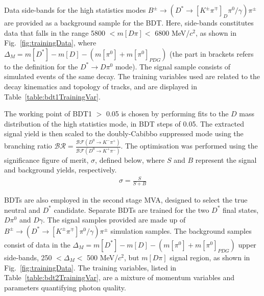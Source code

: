 \documentclass[oneside,12pt]{article}
\begin{document}
Data side-bands for the high statistics modes $B^{\pm}\rightarrow(D^{*}
\rightarrow [K^{\pm}\pi^{\mp}]_{D} \pi^0 /\gamma)\pi^{\pm}$ are provided as a
background sample for the BDT. Here, side-bands constitutes data that falls in
the range 5800 $ < m[D\pi] <$ 6800 MeV/$c^2$, as shown in
Fig.~\ref{fig:trainingData}, where $\Delta_M=m[D^{*}] - m[D]- (m[\pi^0] +
m[\pi^0]_{PDG})$ (the part in brackets refers to the definition for the
$D^*\rightarrow D\pi^0$ mode). The signal sample consists of simulated
events of the same decay. The training variables used are related to the
decay kinematics and topology of tracks, and are displayed in
Table~\ref{table:bdt1TrainingVar}. 

The working point of BDT1 $>$ 0.05 is chosen by performing fits to the $D$ mass
distribution of the high statistics mode, in BDT steps of 0.05. The extracted
signal yield is then scaled to the doubly-Cabibbo suppressed mode using the branching ratio
$\mathcal{BR} = \frac{\mathcal{BF}(D^0 \rightarrow K^- \pi^+)}{\mathcal{BF}(D^0
\rightarrow K^+ \pi^-)}$. The optimisation was performed using the significance
figure of merit, $\sigma$, defined below, where $S$ and $B$ represent the signal
and background yields, respectively.
\begin{align}
  \sigma = \frac{S}{S + B}
  \label{D_branching_ratio}
\end{align}

BDTs are also employed in the second stage MVA, designed to select the true
neutral and $D^*$ candidate. Separate BDTs are trained for the two $D^*$ final
states, $D\pi^0$ and $D\gamma$. The signal samples provided are made up of
$B^{\pm}\rightarrow (D^*\rightarrow [K^{\pm}\pi^{\mp}]\pi^0/\gamma)\pi^{\pm}$
simulation samples. The background samples consist of data in the
$\Delta_M=m[D^{*}] - m[D]- (m[\pi^0] + m[\pi^0]_{PDG})$ upper side-bands, 250 $
< \Delta_{M} < $ 500 MeV/$c^2$, but $m[D\pi]$ signal region, as shown in
Fig.~\ref{fig:trainingData}. The training variables, listed in
Table~\ref{table:bdt2TrainingVar}, are a mixture of momentum variables and
parameters quantifying photon quality. 
\end{document}

